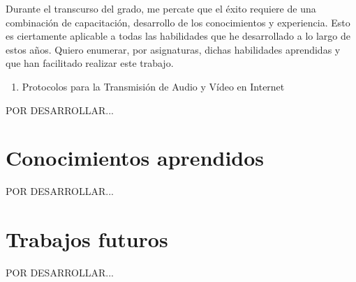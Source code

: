 \documentclass[a4paper, 12pt]{book}
\begin{document}
Durante el transcurso del grado, me percate que el éxito requiere de una combinación de capacitación, desarrollo de los conocimientos y experiencia. Esto es ciertamente aplicable a todas las habilidades que he desarrollado a lo largo de estos años. Quiero enumerar, por asignaturas, dichas habilidades aprendidas y que han facilitado realizar este trabajo.

\begin{enumerate}
  \item Protocolos para la Transmisión de Audio y Vídeo en Internet
\end{enumerate}

POR DESARROLLAR...

\section{Conocimientos aprendidos}
\label{sec:aprendizaje}

POR DESARROLLAR...


\section{Trabajos futuros}
\label{sec:trabajos_futuros}

POR DESARROLLAR...





\cleardoublepage



\end{document}
